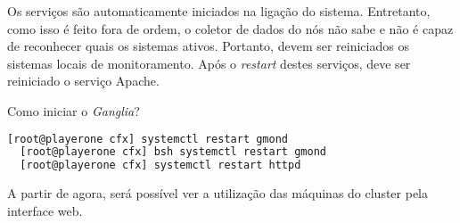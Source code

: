 Os serviços são automaticamente iniciados na ligação do sistema. Entretanto, como isso é feito fora de ordem, o coletor de dados do nós não sabe e não é capaz de reconhecer quais os sistemas ativos. Portanto, devem ser reiniciados os
sistemas locais de monitoramento. Após o \textit{restart} destes serviços, deve ser reiniciado o serviço Apache.

Como iniciar o \textit{Ganglia}?

\begin{lstlisting}[language=bash,basicstyle=\small]
  [root@playerone cfx] systemctl restart gmond
  [root@playerone cfx] bsh systemctl restart gmond
  [root@playerone cfx] systemctl restart httpd
\end{lstlisting}

A partir de agora, será possível ver a utilização das máquinas do cluster pela interface web.

